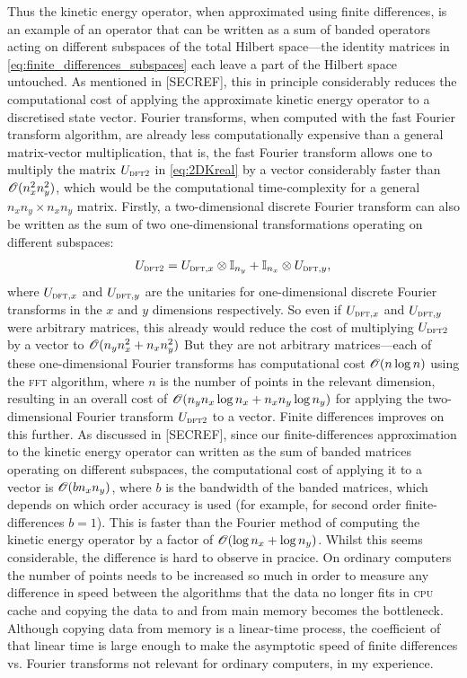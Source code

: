 Thus the kinetic energy operator, when approximated using finite differences, is an example of an operator that can be written as a sum of banded operators acting on different subspaces of the total Hilbert space---the identity matrices in \eqref{eq:finite_differences_subspaces} each leave a part of the Hilbert space untouched. As mentioned in [SECREF], this in principle considerably reduces the computational cost of applying the approximate kinetic energy operator to a discretised state vector. Fourier transforms, when computed with the fast Fourier transform algorithm, are already less computationally expensive than a general matrix-vector multiplication, that is, the fast Fourier transform allows one to multiply the matrix $U_{\textsc{dft2}}$ in \eqref{eq:2DKreal} by a vector considerably faster than $\mathscr{O}(n_x^2n_y^2)$, which would be the computational time-complexity for a general $n_xn_y \times n_xn_y$ matrix. Firstly, a two-dimensional discrete Fourier transform can also be written as the sum of two one-dimensional transformations operating on different subspaces:
\begin{align}
U_{\textsc{dft2}} =
U_{\textsc{dft},x} \otimes \mathbb{I}_{n_y} + \mathbb{I}_{n_x} \otimes U_{\textsc{dft},y},
\end{align}
where $U_{\textsc{dft},x}$ and $U_{\textsc{dft},y}$ are the unitaries for one-dimensional discrete Fourier transforms in the $x$ and $y$ dimensions respectively. So even if $U_{\textsc{dft},x}$ and $U_{\textsc{dft},y}$ were arbitrary matrices, this already would reduce the cost of multiplying $U_{\textsc{dft2}}$ by a vector to $\mathscr{O}(n_y n_x^2 + n_x n_y^2)$ But they are not arbitrary matrices---each of these one-dimensional Fourier transforms has computational cost $\mathscr{O}(n \log n)$ using the \textsc{fft} algorithm, where $n$ is the number of points in the relevant dimension, resulting in an overall cost of $\mathscr{O}(n_y n_x \log n_x + n_x n_y\log n_y)$ for applying the two-dimensional Fourier transform $U_{\textsc{dft2}}$ to a vector. Finite differences improves on this further. As discussed in [SECREF], since our finite-differences approximation to the kinetic energy operator can written as the sum of banded matrices operating on different subspaces, the computational cost of applying it to a vector is $\mathscr{O}(bn_xn_y)$, where $b$ is the bandwidth of the banded matrices, which depends on which order accuracy is used (for example, for second order finite-differences $b=1$). This is faster than the Fourier method of computing the kinetic energy operator by a factor of $\mathscr{O}(\log n_x + \log n_y)$. Whilst this seems considerable, the difference is hard to observe in pracice. On ordinary computers the number of points needs to be increased so much in order to measure any difference in speed between the algorithms that the data no longer fits in \textsc{cpu} cache and copying the data to and from main memory becomes the bottleneck. Although copying data from memory is a linear-time process, the coefficient of that linear time is large enough to make the asymptotic speed of finite differences vs. Fourier transforms not relevant for ordinary computers, in my experience.

